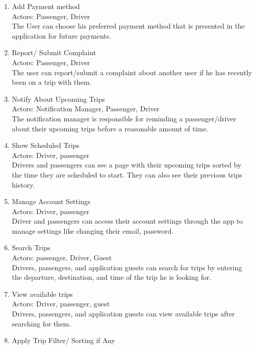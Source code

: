 \documentclass[a4paper, 12pt]{report} %
\begin{document}
\begin{enumerate}
                \item Add Payment method \\
                    Actors: Passenger, Driver \\
                    The User can choose his preferred payment method that is presented in the application for future payments.
                \item Report/ Submit Complaint \\
                    Actors: Passenger, Driver \\
                    The user can report/submit a complaint about another user if he has recently been on a trip with them.
                \item Notify About Upcoming Trips \\
                    Actors: Notification Manager, Passenger, Driver \\
                    The notification manager is responsible for reminding a passenger/driver about their upcoming trips before a reasonable amount of time.
                \item Show Scheduled Trips \\
                    Actors: Driver, passenger \\
                    Drivers and passengers can see a page with their upcoming trips  sorted by the time they are scheduled to start. They can also see their previous trips history.
                \item Manage Account Settings\\ 
                    Actors: Driver, passenger\\
                    Driver and passengers can access their account settings through the app to manage settings like changing their email, password.
                \item Search Trips \\
                    Actors: passenger, Driver, Guest \\
                    Drivers, passengers, and application guests can search for trips by entering the departure, destination, and time of the trip he is looking for.
                \item View available trips \\
                    Actors: Driver, passenger, guest \\
                    Drivers, passengers, and application guests can view available trips after searching for them.
                \item Apply Trip Filter/ Sorting if Any \\

\end{enumerate}
\end{document}
